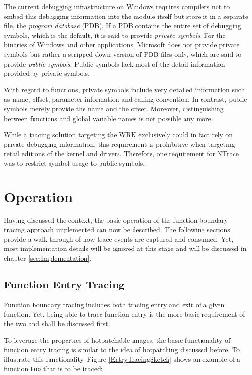 The current debugging infrastructure on Windows requires compilers not to embed this debugging 
information into the module itself but store it in a separate file, the \emph{program database} (PDB).
If a PDB contains the entire set of debugging symbols, which is the default, it is said 
to provide \emph{private symbols}. For the binaries of Windows and other applications,
Microsoft does not provide private symbols but rather a stripped-down version of PDB files
only, which are said to provide \emph{public symbols}. Public symbols lack most of the
detail information provided by private symbols.

With regard to functions, private symbols include very detailed information such as 
name, offset, parameter information and calling convention. In contrast, public 
symbols merely provide the name and the offset. Moreover, distinguishing between 
functions and global variable names is not possible any more.

While a tracing solution targeting the WRK exclusively could in fact rely on private
debugging information, this requirement is prohibitive when targeting retail editions
of the kernel and drivers. Therefore, one requirement for NTrace was to restrict
symbol usage to public symbols.

\section{Operation}
\label{sec:ApproachOperation}

Having discussed the context, the basic operation of the function boundary tracing
approach implemented can now be described. The following sections provide a walk through
of how trace events are captured and consumed. Yet, most implementation details will be 
ignored at this stage and will be discussed in chapter \ref{sec:Implementation}.

\subsection{Function Entry Tracing}
Function boundary tracing includes both tracing entry and exit of a given function. Yet,
being able to trace function entry is the more basic requirement of the two and 
shall be discussed first.

To leverage the properties of hotpatchable images, the basic functionality of function
entry tracing is similar to the idea of hotpatching discussed before. To illustrate
this functionality, Figure \ref{EntryTracingSketch} shows an example of a function
\verb|Foo| that is to be traced:

